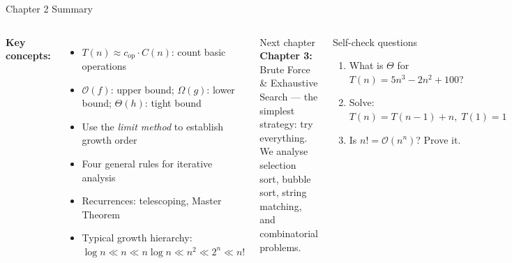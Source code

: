 \documentclass[aspectratio=169]{beamer}
\begin{document}
\begin{frame}[shrink=12]{Chapter 2 Summary}
  \begin{columns}[T]
      \textbf{Key concepts:}
      \begin{itemize}
        \item $T(n)\approx c_{\mathrm{op}}\cdot C(n)$: count basic operations
        \item $\mathcal{O}(f)$: upper bound; $\Omega(g)$: lower bound;
              $\Theta(h)$: tight bound
        \item Use the \emph{limit method} to establish growth order
        \item Four general rules for iterative analysis
        \item Recurrences: telescoping, Master Theorem
        \item Typical growth hierarchy:
              $\log n \ll n \ll n\log n \ll n^2 \ll 2^n \ll n!$
      \end{itemize}
      \begin{block}{Next chapter}
        \textbf{Chapter 3:} Brute Force \& Exhaustive Search —
        the simplest strategy: try everything.
        We analyse selection sort, bubble sort, string matching,
        and combinatorial problems.
      \end{block}
      \vspace{0.3em}
      \begin{exampleblock}{Self-check questions}
        \begin{enumerate}
          \item What is $\Theta$ for $T(n) = 5n^3 - 2n^2 + 100$?
          \item Solve: $T(n) = T(n-1) + n,\; T(1)=1$
          \item Is $n! = \mathcal{O}(n^n)$? Prove it.
        \end{enumerate}
      \end{exampleblock}
  \end{columns}
\end{frame}
\end{document}
